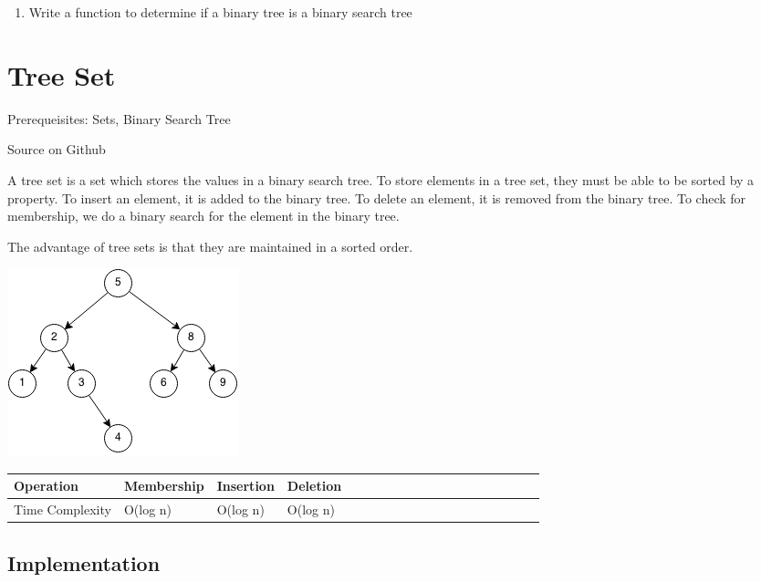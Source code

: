\documentclass[11pt,oneside]{book}
\makeatletter
\def\maxwidth#1{\ifdim\Gin@nat@width>#1 #1\else\Gin@nat@width\fi}
\makeatother
\begin{document}
\begin{enumerate}
\item Write a function to determine if a binary tree is a binary search tree
\end{enumerate}

        \section{ Tree Set }
        

Prerequeisites: Sets, Binary Search Tree

Source on Github

A tree set is a set which stores the values in a binary search tree. To store elements in a tree set, they must be able to be sorted by a property. To insert an element, it is added to the binary tree. To delete an element, it is removed from the binary tree. To check for membership, we do a binary search for the element in the binary tree.

The advantage of tree sets is that they are maintained in a sorted order.

\includegraphics[width=\maxwidth{\textwidth}]{bst.png}

\vspace{10pt} \begin{tabulary}{0.4\linewidth}{|l|l|l|l|l|l|l|l|l|l|l|l|l|l|l|l|l|l|l}\hline


  Operation &
  Membership &
  Insertion &
  Deletion\\
\hline


  Time Complexity &
  O(log n) &
  O(log n) &
  O(log n)\\

\hline\end{tabulary}

\subsection{Implementation}
\end{document}
